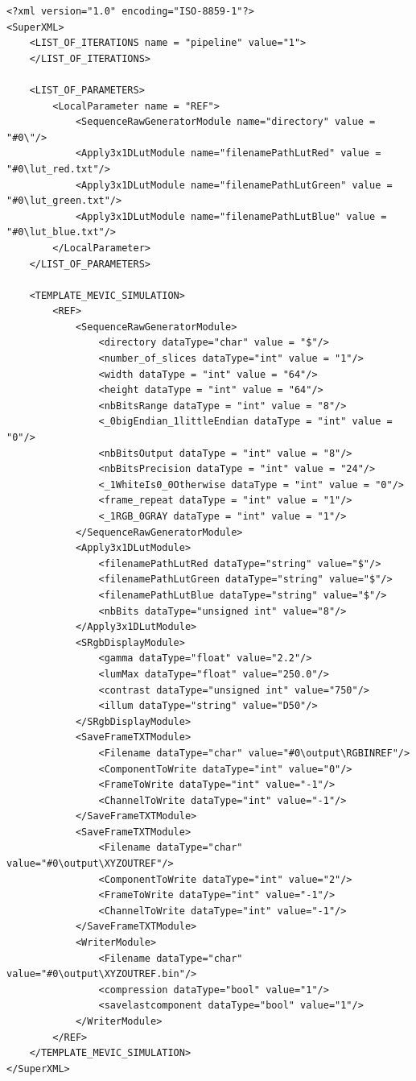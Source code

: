 \lstset{language=XML}
\begin{lstlisting}
<?xml version="1.0" encoding="ISO-8859-1"?>
<SuperXML>
	<LIST_OF_ITERATIONS name = "pipeline" value="1">	
	</LIST_OF_ITERATIONS>
	
	<LIST_OF_PARAMETERS>
		<LocalParameter name = "REF">
			<SequenceRawGeneratorModule name="directory" value = "#0\"/>
			<Apply3x1DLutModule name="filenamePathLutRed" value = "#0\lut_red.txt"/>
			<Apply3x1DLutModule name="filenamePathLutGreen" value = "#0\lut_green.txt"/>
			<Apply3x1DLutModule name="filenamePathLutBlue" value = "#0\lut_blue.txt"/>
		</LocalParameter>				
	</LIST_OF_PARAMETERS>

	<TEMPLATE_MEVIC_SIMULATION>
		<REF>
			<SequenceRawGeneratorModule>
				<directory dataType="char" value = "$"/>
				<number_of_slices dataType="int" value = "1"/>
				<width dataType = "int" value = "64"/>
				<height dataType = "int" value = "64"/>
				<nbBitsRange dataType = "int" value = "8"/>
				<_0bigEndian_1littleEndian dataType = "int" value = "0"/>
				<nbBitsOutput dataType = "int" value = "8"/>
				<nbBitsPrecision dataType = "int" value = "24"/>
				<_1WhiteIs0_0Otherwise dataType = "int" value = "0"/>
				<frame_repeat dataType = "int" value = "1"/>
				<_1RGB_0GRAY dataType = "int" value = "1"/>			
			</SequenceRawGeneratorModule>
			<Apply3x1DLutModule>
				<filenamePathLutRed dataType="string" value="$"/>
				<filenamePathLutGreen dataType="string" value="$"/>
				<filenamePathLutBlue dataType="string" value="$"/>
				<nbBits dataType="unsigned int" value="8"/>
			</Apply3x1DLutModule>	
			<SRgbDisplayModule>
				<gamma dataType="float" value="2.2"/>
				<lumMax dataType="float" value="250.0"/>
				<contrast dataType="unsigned int" value="750"/>
				<illum dataType="string" value="D50"/>
			</SRgbDisplayModule>			
			<SaveFrameTXTModule>
				<Filename dataType="char" value="#0\output\RGBINREF"/>
				<ComponentToWrite dataType="int" value="0"/>
				<FrameToWrite dataType="int" value="-1"/>
				<ChannelToWrite dataType="int" value="-1"/>
			</SaveFrameTXTModule>
			<SaveFrameTXTModule>
				<Filename dataType="char" value="#0\output\XYZOUTREF"/>
				<ComponentToWrite dataType="int" value="2"/>
				<FrameToWrite dataType="int" value="-1"/>
				<ChannelToWrite dataType="int" value="-1"/>
			</SaveFrameTXTModule>	
			<WriterModule>
				<Filename dataType="char" value="#0\output\XYZOUTREF.bin"/>
				<compression dataType="bool" value="1"/>
				<savelastcomponent dataType="bool" value="1"/>
			</WriterModule>			
		</REF>	
	</TEMPLATE_MEVIC_SIMULATION>
</SuperXML>
\end{lstlisting}


